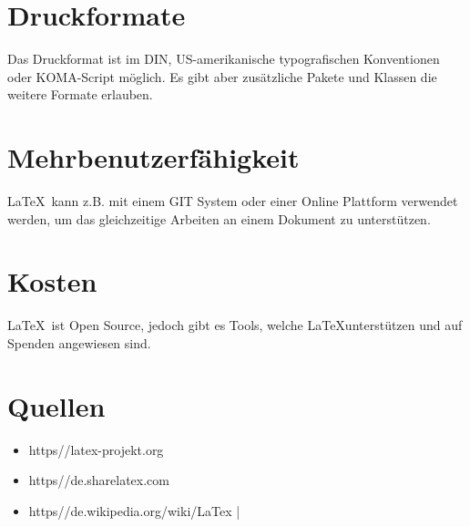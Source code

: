 \documentclass{article}
\begin{document}
\section{Druckformate}
Das Druckformat ist im DIN, US-amerikanische typografischen Konventionen oder KOMA-Script möglich. Es gibt aber zusätzliche Pakete und Klassen die weitere Formate erlauben.

\section{Mehrbenutzerfähigkeit}
\LaTeX\ kann z.B. mit einem GIT System oder einer Online Plattform verwendet werden, um das gleichzeitige Arbeiten an einem Dokument zu unterstützen. 

\section{Kosten}
\LaTeX\ ist Open Source, jedoch gibt es Tools, welche \LaTeX unterstützen und auf Spenden angewiesen sind.

\section{Quellen}
\begin{itemize}
	\item https//latex-projekt.org
	\item https//de.sharelatex.com
	\item https//de.wikipedia.org/wiki/LaTex
|\end{itemize}
\end{document}
